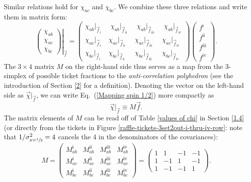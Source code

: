 Similar relations hold for $\chi_{ac}$ and $\chi_{bc}$. We combine these three relations and write them in matrix form: 
\begin{equation}
\left. \begin{pmatrix}
\chi_{ab}\\[.2cm]
\chi_{ac}\\[.2cm]
\chi_{bc}
\end{pmatrix} \right|_{\vec{f}} = 
\begin{pmatrix}
   \chi_{ab} |_{\vec{f}_{\mathrm{i}} } \; & \; \chi_{ab} |_{\vec{f}_{\mathrm{ii}} } \; & \; \chi_{ab} |_{\vec{f}_{\mathrm{iii}} } \; & \; \chi_{ab} |_{\vec{f}_{\mathrm{iv}} } \\[.4cm]
     \chi_{ac} |_{\vec{f}_{\mathrm{i}} } & \chi_{ac} |_{\vec{f}_{\mathrm{ii}} } & \chi_{ac} |_{\vec{f}_{\mathrm{iii}} } & \chi_{ac} |_{\vec{f}_{\mathrm{iv}} }  \\[.4cm]
     \chi_{bc} |_{\vec{f}_{\mathrm{i}} } & \chi_{bc} |_{\vec{f}_{\mathrm{ii}} } & \chi_{bc} |_{\vec{f}_{\mathrm{iii}} } & \chi_{bc} |_{\vec{f}_{\mathrm{iv}} }  
\end{pmatrix}
\begin{pmatrix} f^{\mathrm{i}} \\[.2cm]
f^{\mathrm{ii}} \\[.2cm]
f^{\mathrm{iii}} \\[.2cm]
f^{\mathrm{iv}} \end{pmatrix}.
\label{Mapping spin 1/2}
\end{equation}
The $3 \times 4$ matrix $M$ on the right-hand side thus serves as a map from the 3-simplex of possible ticket fractions to the \emph{anti-correlation polyhedron} (see the introduction of Section \ref{2} for a definition). Denoting the vector on the left-hand side as $\vec{\chi}|_{\vec{f}}$, we can write Eq.\ (\ref{Mapping spin 1/2}) more compactly as
\begin{equation}
\vec{\chi}|_{\vec{f}} \equiv M \vec{f}.
\label{Mapping spin 1/2 a}
\end{equation}
The matrix elements of $M$ can be read off of Table \ref{values of chi} in Section \ref{1.4} (or directly from the tickets in Figure \ref{raffle-tickets-3set2out-i-thru-iv-row}: note that $1/\sigma_{s=\sfrac12}^2 = 4$ cancels the 4 in the denominators of the covariances):
\begin{equation}
M = \begin{pmatrix}
    M_{ab}^{\mathrm{i}} & M_{ab}^{\mathrm{ii}} & M_{ab}^{\mathrm{iii}} & M_{ab}^{\mathrm{iv}} \\[.2cm]
    M_{ac}^{\mathrm{i}} & M_{ac}^{\mathrm{ii}} & M_{ac}^{\mathrm{iii}} & M_{ac}^{\mathrm{iv}} \\[.2cm] 
    M_{bc}^{\mathrm{i}} & M_{bc}^{\mathrm{ii}} & M_{bc}^{\mathrm{iii}} & M_{bc}^{\mathrm{iv}}
\end{pmatrix}
= \begin{pmatrix}
    1 & 1 & -1 & -1 \\[.2cm]
    1 & -1 & 1 & -1 \\[.2cm]
    1 & -1 & -1 & 1 
\end{pmatrix}.
\label{Mapping spin 1/2 b}
\end{equation}
